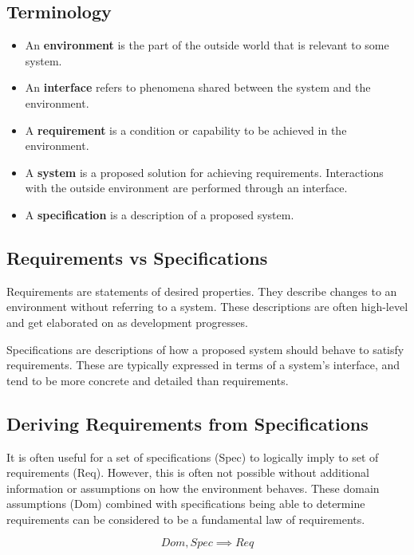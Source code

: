 \documentclass[12pt,titlepage]{article}
\begin{document}
    \subsection{Terminology}
      \begin{itemize}
        \item An \textbf{environment} is the part of the outside world that is relevant to some system.
        \item An \textbf{interface} refers to phenomena shared between the system and the environment.
        \item A \textbf{requirement} is a condition or capability to be achieved in the environment.
        \item A \textbf{system} is a proposed solution for achieving requirements. Interactions with the outside environment are performed
          through an interface.
        \item A \textbf{specification} is a description of a proposed system.
      \end{itemize}

    \subsection{Requirements vs Specifications}
      Requirements are statements of desired properties. They describe changes to an environment without referring to a system. These descriptions are often
      high-level and get elaborated on as development progresses.

      Specifications are descriptions of how a proposed system should behave to satisfy requirements. These are typically expressed in terms of a system's
      interface, and tend to be more concrete and detailed than requirements.

    \subsection{Deriving Requirements from Specifications}
      It is often useful for a set of specifications (Spec) to logically imply to set of requirements (Req). However, this is often not possible without additional
      information or assumptions on how the environment behaves. These domain assumptions (Dom) combined with specifications being able to determine requirements
      can be considered to be a fundamental law of requirements.

      $$ Dom, Spec \implies Req $$
\end{document}
